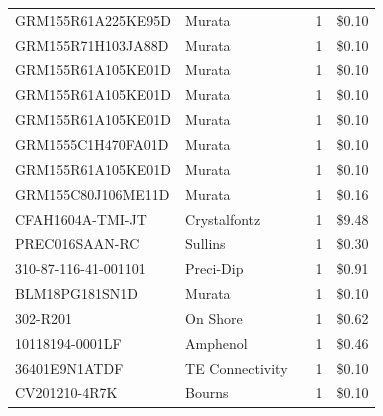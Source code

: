\documentclass[journal,compsoc]{IEEEtran}
\begin{document}
\begin{table}[]
\begin{tabular}{|rrr|r|r|}
    \multicolumn{1}{|l}{GRM155R61A225KE95D} & \multicolumn{1}{l}{Murata} & \multicolumn{1}{r}{} & \multicolumn{1}{r}{1} & \$0.10  \\
    \multicolumn{1}{|l}{GRM155R71H103JA88D} & \multicolumn{1}{l}{Murata} & \multicolumn{1}{r}{} & \multicolumn{1}{r}{1} & \$0.10  \\
    \multicolumn{1}{|l}{GRM155R61A105KE01D} & \multicolumn{1}{l}{Murata} & \multicolumn{1}{r}{} & \multicolumn{1}{r}{1} & \$0.10  \\
    \multicolumn{1}{|l}{GRM155R61A105KE01D} & \multicolumn{1}{l}{Murata} & \multicolumn{1}{r}{} & \multicolumn{1}{r}{1} & \$0.10  \\
    \multicolumn{1}{|l}{GRM155R61A105KE01D} & \multicolumn{1}{l}{Murata} & \multicolumn{1}{r}{} & \multicolumn{1}{r}{1} & \$0.10  \\
    \multicolumn{1}{|l}{GRM1555C1H470FA01D} & \multicolumn{1}{l}{Murata} & \multicolumn{1}{r}{} & \multicolumn{1}{r}{1} & \$0.10  \\
    \multicolumn{1}{|l}{GRM155R61A105KE01D} & \multicolumn{1}{l}{Murata} & \multicolumn{1}{r}{} & \multicolumn{1}{r}{1} & \$0.10  \\
    \multicolumn{1}{|l}{GRM155C80J106ME11D} & \multicolumn{1}{l}{Murata} & \multicolumn{1}{r}{} & \multicolumn{1}{r}{1} & \$0.16  \\
    \multicolumn{1}{|l}{CFAH1604A-TMI-JT} & \multicolumn{1}{l}{Crystalfontz} & \multicolumn{1}{r}{} & \multicolumn{1}{r}{1} & \$9.48  \\
    \multicolumn{1}{|l}{PREC016SAAN-RC} & \multicolumn{1}{l}{Sullins} & \multicolumn{1}{r}{} & \multicolumn{1}{r}{1} & \$0.30  \\
    \multicolumn{1}{|l}{310-87-116-41-001101} & \multicolumn{1}{l}{Preci-Dip} & \multicolumn{1}{r}{} & \multicolumn{1}{r}{1} & \$0.91  \\
    \multicolumn{1}{|l}{BLM18PG181SN1D} & \multicolumn{1}{l}{Murata} & \multicolumn{1}{r}{} & \multicolumn{1}{r}{1} & \$0.10  \\
    \multicolumn{1}{|l}{302-R201} & \multicolumn{1}{l}{On Shore} & \multicolumn{1}{r}{} & \multicolumn{1}{r}{1} & \$0.62  \\
    \multicolumn{1}{|l}{10118194-0001LF} & \multicolumn{1}{l}{Amphenol} & \multicolumn{1}{r}{} & \multicolumn{1}{r}{1} & \$0.46  \\
    \multicolumn{1}{|l}{36401E9N1ATDF} & \multicolumn{1}{l}{TE Connectivity} & \multicolumn{1}{r}{} & \multicolumn{1}{r}{1} & \$0.10  \\
    \multicolumn{1}{|l}{CV201210-4R7K} & \multicolumn{1}{l}{Bourns} & \multicolumn{1}{r}{} & \multicolumn{1}{r}{1} & \$0.10  \\

\end{tabular}
\end{table}
\end{document}
